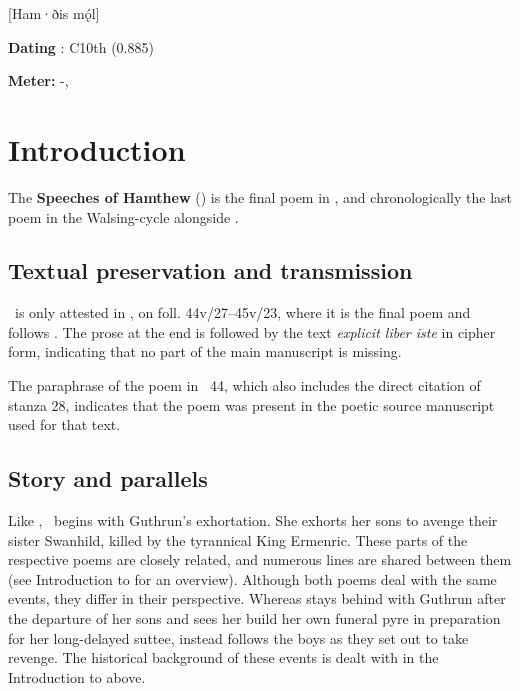 [Ham·ðis mǫ́l]

\begin{flushright}%
\textbf{Dating} \parencite{Sapp2022}: C10th (0.885)

\textbf{Meter:} \Fornyrdislag-\Malahattr, \Ljodahattr%
\end{flushright}%

\section{Introduction}

The \textbf{Speeches of Hamthew} () is the final poem in \Regius, and chronologically the last poem in the Walsing-cycle alongside .

\subsection{Textual preservation and transmission}

\Hamdismal\ is only attested in \Regius, on foll. 44v/27--45v/23, where it is the final poem and follows .  The prose at the end is followed by the text \emph{explicit liber iste} in cipher form, indicating that no part of the main manuscript is missing.

The paraphrase of the poem in \VolsungaSaga\ 44, which also includes the direct citation of stanza 28, indicates that the poem was present in the poetic source manuscript used for that text.

\subsection{Story and parallels}

Like , \Hamdismal\ begins with Guthrun’s exhortation.  She exhorts her sons to avenge their sister Swanhild, killed by the tyrannical King Ermenric.  These parts of the respective poems are closely related, and numerous lines are shared between them (see Introduction to  for an overview).
Although both poems deal with the same events, they differ in their perspective.  Whereas  stays behind with Guthrun after the departure of her sons and sees her build her own funeral pyre in preparation for her long-delayed suttee,  instead follows the boys as they set out to take revenge.
The historical background of these events is dealt with in the Introduction to  above.

